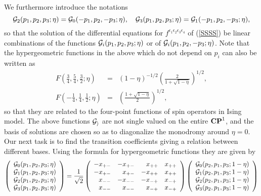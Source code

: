 \documentclass[a4paper,12pt]{article}
\newcommand{\tfrac}[2]{{\textstyle\frac{#1}{#2}}}
\newcommand{\cG}{{\cal G}}
\newcommand{\ep}{{\epsilon}}
\begin{document}
 We furthermore introduce the notations
\begin{equation}
  \cG_2( p_1, p_2, p_3;\eta) = 
  \cG_0(-p_1, p_2,-p_3;\eta),~~~
  \cG_3( p_1, p_2, p_3;\eta) = 
  \cG_1(-p_1, p_2,-p_3;\eta),
\end{equation}
 so that the solution of the differential equations for
 $f^{\ep_1\ep_2\ep_3\ep_4}$ of (\ref{SSSS}) be
 linear combinations of the functions $\cG_i( p_1, p_2, p_3;\eta)$
 or of $\cG_i( p_1, p_2,-p_3;\eta)$.
 Note that the hypergeometric functions in the above which do
 not depend on $p_i$ can also be written as
\begin{eqnarray}
  F(\tfrac{3}{4},\tfrac{5}{4},\tfrac{3}{2};\eta)
 &=& (1-\eta)^{-1/2}\left(\frac{2}{1+\sqrt{1-\eta}}\right)^{1/2}, \nonumber\\
  F(-\tfrac{1}{4},\tfrac{1}{4},\tfrac{1}{2};\eta)
 &=& \left(\frac{1+\sqrt{1-\eta}}{2}\right)^{1/2},
\end{eqnarray}
 so that they are related to the four-point functions of
 spin operators in Ising model\cite{BPZ}.
 The above functions ${\cal G_i}$ are not single valued
 on the entire ${\bf CP}^1$,
 and the basis of solutions are chosen so as to diagonalize the
 monodromy around $\eta=0$.
 Our next task is to find the transition coefficients giving
 a relation between different bases.
 Using the formula for hypergeometric functions
 they are given by
\begin{equation}
\left(\begin{array}{c}
  \cG_0(p_1,p_2,p_3;\eta) \\
  \cG_1(p_1,p_2,p_3;\eta) \\
  \cG_2(p_1,p_2,p_3;\eta) \\
  \cG_3(p_1,p_2,p_3;\eta)
\end{array}\right)
 = \frac{1}{\sqrt{2}}
   \left(\begin{array}{rrrr}
    -x_{+-} &-x_{+-} & x_{++} & x_{++} \\
    -x_{+-} & x_{+-} &-x_{++} & x_{++} \\
     x_{--} &-x_{--} &-x_{-+} & x_{-+} \\
     x_{--} & x_{--} & x_{-+} & x_{-+}
   \end{array}\right)
\left(\begin{array}{c}
  \cG_0(p_2,p_1,p_3;1-\eta) \\
  \cG_1(p_2,p_1,p_3;1-\eta) \\
  \cG_2(p_2,p_1,p_3;1-\eta) \\
  \cG_3(p_2,p_1,p_3;1-\eta)
\end{array}\right)
\end{equation}
\end{document}
